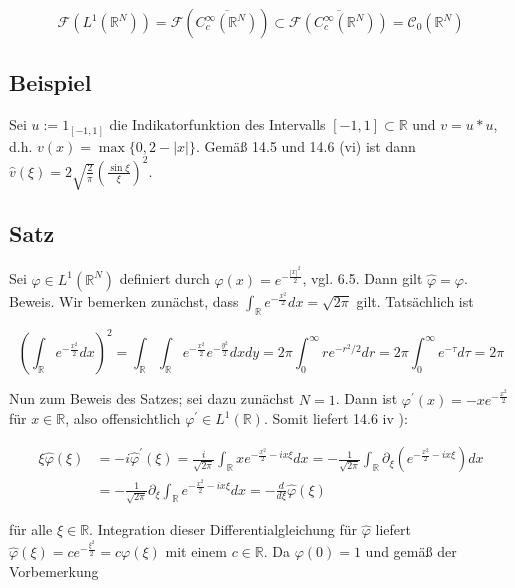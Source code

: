 \documentclass[10pt, letterpaper]{article}
\begin{document}
$$
\mathcal{F}\left(L^{1}\left(\mathbb{R}^{N}\right)\right)=\mathcal{F}\left(\overline{C_{c}^{\infty}\left(\mathbb{R}^{N}\right)}\right) \subset \overline{\mathcal{F}\left(C_{c}^{\infty}\left(\mathbb{R}^{N}\right)\right)}=\mathcal{C}_{0}\left(\mathbb{R}^{N}\right)
$$

\subsection*{Beispiel}
Sei $u:=1_{[-1,1]}$ die Indikatorfunktion des Intervalls $[-1,1] \subset \mathbb{R}$ und $v=u * u$, d.h. $v(x)=\max \{0,2-|x|\}$. Gemäß 14.5 und 14.6 (vi) ist dann $\hat{v}(\xi)=2 \sqrt{\frac{2}{\pi}}\left(\frac{\sin \xi}{\xi}\right)^{2}$.

\subsection*{Satz}
Sei $\varphi \in L^{1}\left(\mathbb{R}^{N}\right)$ definiert durch $\varphi(x)=e^{-\frac{|x|^{2}}{2}}$, vgl. 6.5. Dann gilt $\hat{\varphi}=\varphi$.\\
Beweis. Wir bemerken zunächst, dass $\int_{\mathbb{R}} e^{-\frac{x^{2}}{2}} d x=\sqrt{2 \pi}$ gilt. Tatsächlich ist

$$
\left(\int_{\mathbb{R}} e^{-\frac{x^{2}}{2}} d x\right)^{2}=\int_{\mathbb{R}} \int_{\mathbb{R}} e^{-\frac{x^{2}}{2}} e^{-\frac{y^{2}}{2}} d x d y=2 \pi \int_{0}^{\infty} r e^{-r^{2} / 2} d r=2 \pi \int_{0}^{\infty} e^{-\tau} d \tau=2 \pi
$$

Nun zum Beweis des Satzes; sei dazu zunächst $N=1$. Dann ist $\varphi^{\prime}(x)=-x e^{-\frac{x^{2}}{2}}$ für $x \in \mathbb{R}$, also offensichtlich $\varphi^{\prime} \in L^{1}(\mathbb{R})$. Somit liefert 14.6 iv ):

$$
\begin{aligned}
\xi \hat{\varphi}(\xi) & =-i \widehat{\varphi}^{\prime}(\xi)=\frac{i}{\sqrt{2 \pi}} \int_{\mathbb{R}} x e^{-\frac{x^{2}}{2}-i x \xi} d x=-\frac{1}{\sqrt{2 \pi}} \int_{\mathbb{R}} \partial_{\xi}\left(e^{-\frac{x^{2}}{2}-i x \xi}\right) d x \\
& =-\frac{1}{\sqrt{2 \pi}} \partial_{\xi} \int_{\mathbb{R}} e^{-\frac{x^{2}}{2}-i x \xi} d x=-\frac{d}{d \xi} \hat{\varphi}(\xi)
\end{aligned}
$$

für alle $\xi \in \mathbb{R}$. Integration dieser Differentialgleichung für $\hat{\varphi}$ liefert $\hat{\varphi}(\xi)=c e^{-\frac{\xi^{2}}{2}}= c \varphi(\xi)$ mit einem $c \in \mathbb{R}$. Da $\varphi(0)=1$ und gemäß der Vorbemerkung
\end{document}
